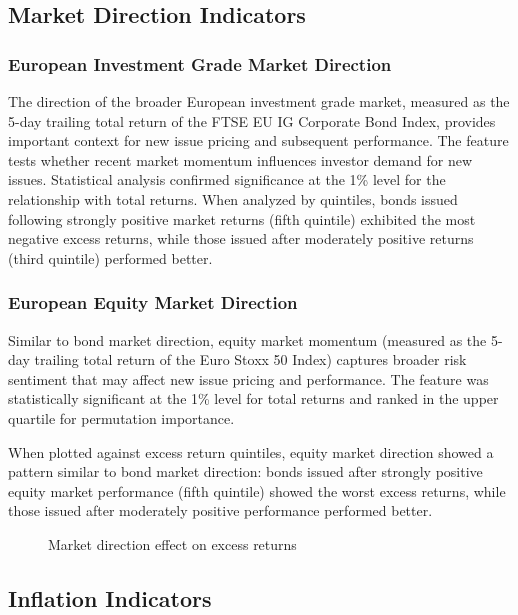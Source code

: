 \subsection{Market Direction Indicators}

\subsubsection{European Investment Grade Market Direction}
The direction of the broader European investment grade market, measured as the 5-day trailing total return of the FTSE EU IG Corporate Bond Index, provides important context for new issue pricing and subsequent performance. The feature tests whether recent market momentum influences investor demand for new issues. Statistical analysis confirmed significance at the 1\% level for the relationship with total returns. When analyzed by quintiles, bonds issued following strongly positive market returns (fifth quintile) exhibited the most negative excess returns, while those issued after moderately positive returns (third quintile) performed better.

\subsubsection{European Equity Market Direction}
Similar to bond market direction, equity market momentum (measured as the 5-day trailing total return of the Euro Stoxx 50 Index) captures broader risk sentiment that may affect new issue pricing and performance. The feature was statistically significant at the 1\% level for total returns and ranked in the upper quartile for permutation importance.

When plotted against excess return quintiles, equity market direction showed a pattern similar to bond market direction: bonds issued after strongly positive equity market performance (fifth quintile) showed the worst excess returns, while those issued after moderately positive performance performed better.

\begin{figure}[h]
    \begin{center}
        
    \end{center}
    \caption{Market direction effect on excess returns}
    \label{fig:eu_direction}
\end{figure}

\subsection{Inflation Indicators}

